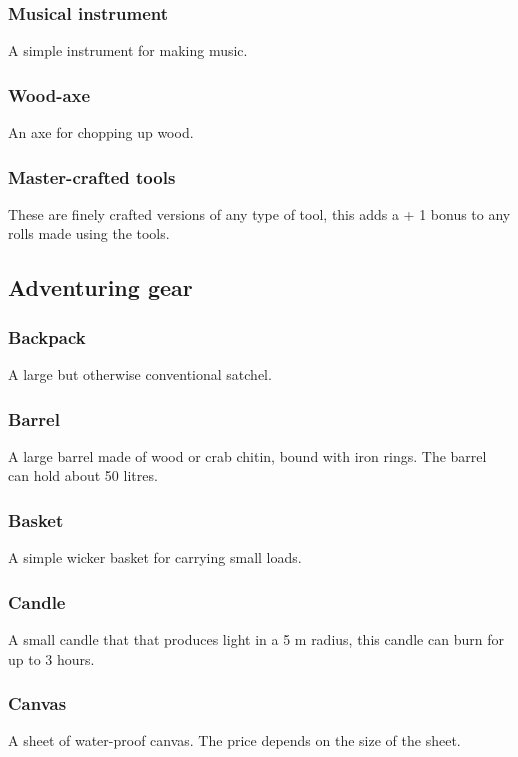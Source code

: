\documentclass[a4paper,11pt,oneside]{book}
\newcommand{\textlf}[1]{\textbf{\titlecap{#1}}}
\begin{document}
\subsubsection*{Musical instrument}
A simple instrument for making music.

\subsubsection*{Wood-axe}
An axe for chopping up wood.

\subsubsection*{Master-crafted tools}
These are finely crafted versions of any type of tool, this adds a + 1 bonus to any rolls made using the tools.

\subsection{Adventuring gear}

\subsubsection*{Backpack}
A large but otherwise conventional satchel.

\subsubsection*{Barrel}
A large barrel made of wood or crab chitin, bound with iron rings. The barrel can hold about 50 litres.

\subsubsection*{Basket}
A simple wicker basket for carrying small loads.

\subsubsection*{Candle}
A small candle that that produces \textlf{low} light in a 5 m radius, this candle can burn for up to 3 hours.

\subsubsection*{Canvas}
A sheet of water-proof canvas. The price depends on the size of the sheet.
\end{document}
